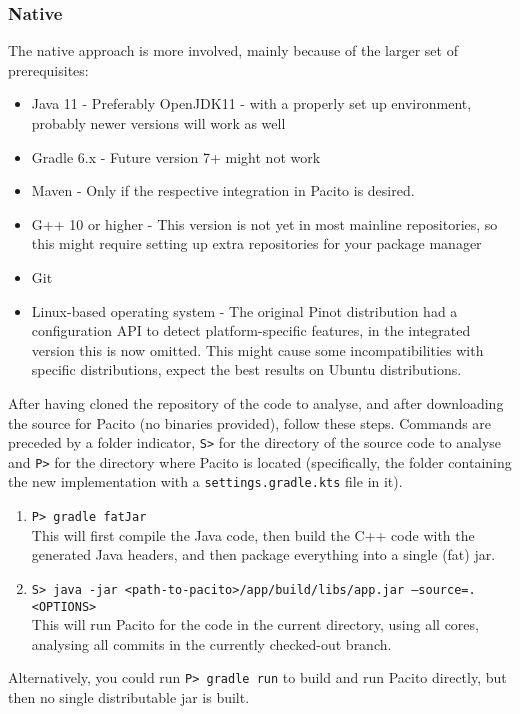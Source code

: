 \subsubsection{Native}
The native approach is more involved, mainly because of the larger set of prerequisites:
\begin{itemize}
    \item Java 11 - Preferably OpenJDK11 - with a properly set up environment, probably newer versions will work as well
    \item Gradle 6.x - Future version 7+ might not work
    \item Maven - Only if the respective integration in Pacito is desired.
    \item G++ 10 or higher - This version is not yet in most mainline repositories, so this might require setting up extra repositories for your package manager
    \item Git
    \item Linux-based operating system - The original Pinot distribution had a configuration API to detect platform-specific features, in the integrated version this is now omitted. This might cause some incompatibilities with specific distributions, expect the best results on Ubuntu distributions.
\end{itemize}

After having cloned the repository of the code to analyse, and after downloading the source for Pacito (no binaries provided), follow these steps. Commands are preceded by a folder indicator, {\tt S>} for the directory of the source code to analyse and {\tt P>} for the directory where Pacito is located (specifically, the folder containing the new implementation with a {\tt settings.gradle.kts} file in it).
\begin{enumerate}[label=\bf\arabic*)]
    \item {\tt P> gradle fatJar} \\ This will first compile the Java code, then build the C++ code with the generated Java headers, and then package everything into a single (fat) jar.
    \item {\tt S> java -jar <path-to-pacito>/app/build/libs/app.jar --source=. <OPTIONS>} \\ This will run Pacito for the code in the current directory, using all cores, analysing all commits in the currently checked-out branch.
\end{enumerate}

Alternatively, you could run {\tt P> gradle run} to build and run Pacito directly, but then no single distributable jar is built.

